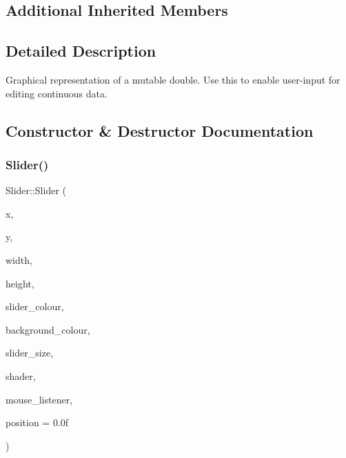 \subsection*{Additional Inherited Members}


\subsection{Detailed Description}
Graphical representation of a mutable double. Use this to enable user-\/input for editing continuous data. 

\subsection{Constructor \& Destructor Documentation}
\mbox{\label{class_slider_ad9bceb3f462c084a91bfe910065fe94f}} 
\subsubsection{\texorpdfstring{Slider()}{Slider()}}
{\footnotesize\ttfamily Slider\+::\+Slider (\begin{DoxyParamCaption}\item[{float}]{x,  }\item[{float}]{y,  }\item[{float}]{width,  }\item[{float}]{height,  }\item[{\mbox{\hyperlink{class_vector4}{Vector4F}}}]{slider\+\_\+colour,  }\item[{\mbox{\hyperlink{class_vector4}{Vector4F}}}]{background\+\_\+colour,  }\item[{\mbox{\hyperlink{class_vector2}{Vector2F}}}]{slider\+\_\+size,  }\item[{\mbox{\hyperlink{class_shader}{Shader}} \&}]{shader,  }\item[{\mbox{\hyperlink{class_mouse_listener}{Mouse\+Listener}} \&}]{mouse\+\_\+listener,  }\item[{float}]{position = {\ttfamily 0.0f} }\end{DoxyParamCaption})}

